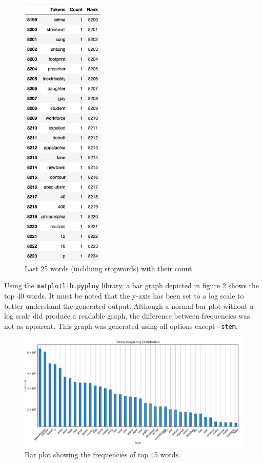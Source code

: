\documentclass[titlepage]{article}
\begin{document}
\begin{figure}[H]
    \centering
    \includegraphics[width=0.35\textwidth]{figures/df_last25_stopwords.png}
    \caption{Last 25 words (inclduing stopwords) with their count.}
    \label{fig:FigLast25Stop}
\end{figure}

Using the \texttt{matplotlib.pyploy} library, a bar graph depicted in figure \ref{fig:FigBar} shows 
the top 40 words. It must be noted that the y-axis has been set to a log scale to better understand
the generated output. Although a normal bar plot without a log scale did produce a readable graph,
the difference between frequencies was not as apparent. This graph was generated using all 
options except \texttt{--stem}.

\begin{figure}[H]
    \includegraphics[width=\textwidth]{figures/bar_plot.png}
    \caption{Bar plot showing the frequencies of top 45 words.}
    \label{fig:FigBar}
\end{figure}
\end{document}
